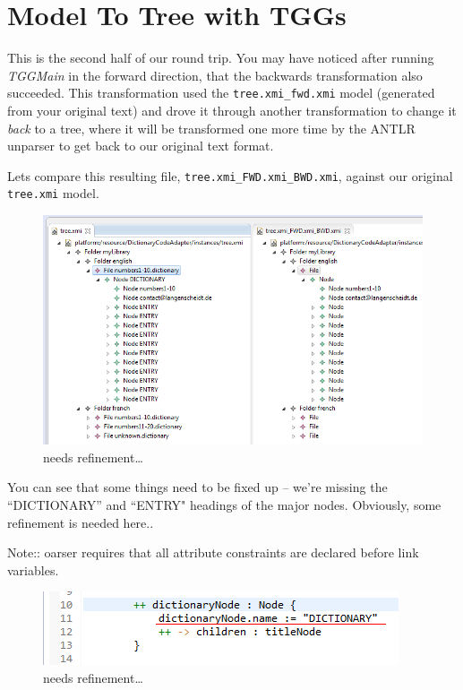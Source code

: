 \newpage
\section{Model To Tree with TGGs}

This is the second half of our round trip. You may have noticed after running \emph{TGGMain} in the forward direction, that the backwards transformation also
succeeded. This transformation used the \texttt{tree.xmi\_fwd.xmi} model (generated from your original text) and drove it through another transformation to
change it \emph{back} to a tree, where it will be transformed one more time by the ANTLR unparser to get back to our original text format.

Lets compare this resulting file, \texttt{tree.xmi\_FWD.xmi\_BWD.xmi}, against our original \texttt{tree.xmi} model.

\begin{figure}[htp]
\begin{center}
  \includegraphics[width=\textwidth]{eclipse_generatedBackwardsModel}
  \caption[labelInTOC]{needs refinement\ldots}
  \label{eclipse:generatedBkwrdMdl}
\end{center}
\end{figure}

You can see that some things need to be fixed up -- we're missing the ``DICTIONARY'' and ``ENTRY" headings of the major nodes. Obviously, some refinement is
needed here..

Note:: oarser requires that all attribute constraints are declared before link variables.


\begin{figure}[htp]
\begin{center}
  \includegraphics[width=\textwidth]{eclipse_NodeToDictionaryRule_updated}
  \caption[labelInTOC]{needs refinement\ldots}
  \label{eclipse:generatedBkwrdMdl}
\end{center}
\end{figure}

